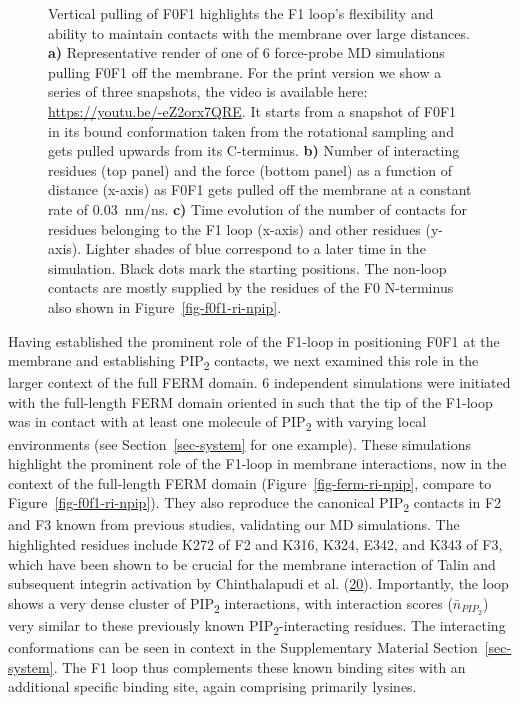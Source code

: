 \documentclass[
  twocolumn]{biophys-new-mod}
\begin{document}
\begin{figure}
\begin{minipage}[t]{0.50\linewidth}
\subcaption{\label{fig-f0f1-vert-pull-contacts}~}
\end{minipage}%

\caption{\label{fig-f0f1-vert-pull}Vertical pulling of F0F1 highlights
the F1 loop's flexibility and ability to maintain contacts with the
membrane over large distances. \textbf{a)} Representative render of one
of 6 force-probe MD simulations pulling F0F1 off the membrane. For the
print version we show a series of three snapshots, the video is
available here: \url{https://youtu.be/-eZ2orx7QRE}. It starts from a
snapshot of F0F1 in its bound conformation taken from the rotational
sampling and gets pulled upwards from its C-terminus. \textbf{b)} Number
of interacting residues (top panel) and the force (bottom panel) as a
function of distance (x-axis) as F0F1 gets pulled off the membrane at a
constant rate of 0.03~nm/ns. \textbf{c)} Time evolution of the number of
contacts for residues belonging to the F1 loop (x-axis) and other
residues (y-axis). Lighter shades of blue correspond to a later time in
the simulation. Black dots mark the starting positions. The non-loop
contacts are mostly supplied by the residues of the F0 N-terminus also
shown in Figure~\ref{fig-f0f1-ri-npip}.}

\end{figure}

Having established the prominent role of the F1-loop in positioning F0F1
at the membrane and establishing PIP\textsubscript{2} contacts, we next
examined this role in the larger context of the full FERM domain. 6
independent simulations were initiated with the full-length FERM domain
oriented in such that the tip of the F1-loop was in contact with at
least one molecule of PIP\textsubscript{2} with varying local
environments (see Section~\ref{sec-system} for one example). These
simulations highlight the prominent role of the F1-loop in membrane
interactions, now in the context of the full-length FERM domain
(Figure~\ref{fig-ferm-ri-npip}, compare to
Figure~\ref{fig-f0f1-ri-npip}). They also reproduce the canonical
PIP\textsubscript{2} contacts in F2 and F3 known from previous studies,
validating our MD simulations. The highlighted residues include K272 of
F2 and K316, K324, E342, and K343 of F3, which have been shown to be
crucial for the membrane interaction of Talin and subsequent integrin
activation by Chinthalapudi et al.
(\protect\hyperlink{ref-chinthalapudiInteractionTalinCell2018a}{20}).
Importantly, the loop shows a very dense cluster of PIP\textsubscript{2}
interactions, with interaction scores (\(\bar n_{PIP_2}\)) very similar
to these previously known PIP\textsubscript{2}-interacting residues. The
interacting conformations can be seen in context in the Supplementary
Material Section~\ref{sec-system}. The F1 loop thus complements these
known binding sites with an additional specific binding site, again
comprising primarily lysines.
\end{document}
